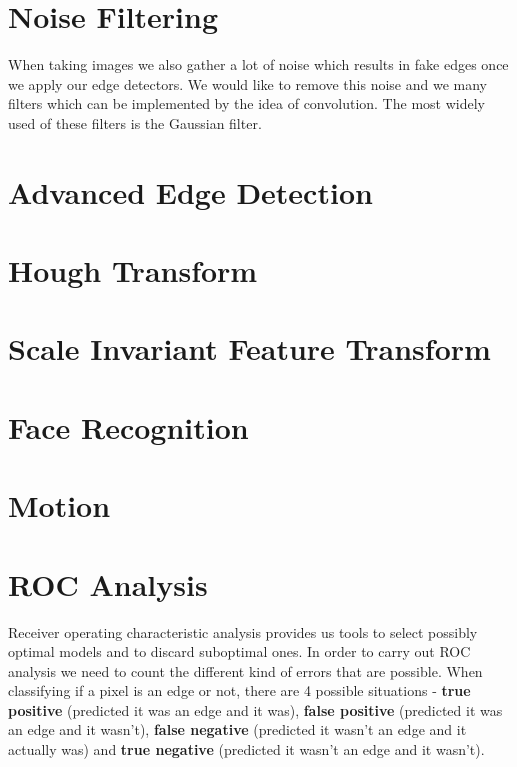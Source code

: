 \documentclass{article}
\begin{document}
	\section{Noise Filtering}
	When taking images we also gather a lot of noise which results in fake edges once we apply our edge detectors. We would like to remove this noise and we many filters which can be implemented by the idea of convolution. The most widely used of these filters is the Gaussian filter.

	\section{Advanced Edge Detection}

	\section{Hough Transform}

	\section{Scale Invariant Feature Transform}

	\section{Face Recognition}

	\section{Motion}

	\section{ROC Analysis}
	Receiver operating characteristic analysis provides us tools to select possibly optimal models and to discard suboptimal ones. In order to carry out ROC analysis we need to count the different kind of errors that are possible. When classifying if a pixel is an edge or not, there are 4 possible situations - \textbf{true positive} (predicted it was an edge and it was), \textbf{false positive} (predicted it was an edge and it wasn't), \textbf{false negative} (predicted it wasn't an edge and it actually was) and \textbf{true negative} (predicted it wasn't an edge and it wasn't).
	
\end{document}
